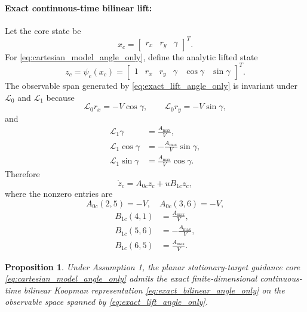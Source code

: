 \documentclass[letterpaper,journal]{IEEEtran}
\newtheorem{proposition}{Proposition}
\begin{document}
\paragraph{Exact continuous-time bilinear lift:}
Let the core state be
\begin{equation}
    x_c=\begin{bmatrix}r_x&r_y&\gamma\end{bmatrix}^T .
\end{equation}
For \eqref{eq:cartesian_model_angle_only}, define the analytic lifted state
\begin{equation}
    z_c=\psi_c(x_c)=
    \begin{bmatrix}
    1&r_x&r_y&\gamma&\cos\gamma&\sin\gamma
    \end{bmatrix}^T .
    \label{eq:exact_lift_angle_only}
\end{equation}
The observable span generated by \eqref{eq:exact_lift_angle_only} is invariant under $\mathcal L_0$ and $\mathcal L_1$ because
\begin{equation}
    \mathcal L_0 r_x=-V\cos\gamma,\qquad
    \mathcal L_0 r_y=-V\sin\gamma ,
\end{equation}
and
\begin{equation}
\begin{aligned}
    \mathcal L_1 \gamma&=\frac{A_{\max}}{V},\\
    \mathcal L_1 \cos\gamma&=-\frac{A_{\max}}{V}\sin\gamma,\\
    \mathcal L_1 \sin\gamma&=\frac{A_{\max}}{V}\cos\gamma .
\end{aligned}
\end{equation}
Therefore
\begin{equation}
    \dot z_c=A_{0c}z_c+uB_{1c}z_c ,
    \label{eq:exact_bilinear_angle_only}
\end{equation}
where the nonzero entries are
\begin{equation}
    A_{0c}(2,5)=-V,\quad A_{0c}(3,6)=-V,
\end{equation}
\begin{equation}
\begin{aligned}
    B_{1c}(4,1)&=\frac{A_{\max}}{V},\\
    B_{1c}(5,6)&=-\frac{A_{\max}}{V},\\
    B_{1c}(6,5)&=\frac{A_{\max}}{V}.
\end{aligned}
\end{equation}

\begin{proposition}
Under Assumption 1, the planar stationary-target guidance core \eqref{eq:cartesian_model_angle_only} admits the exact finite-dimensional continuous-time bilinear Koopman representation \eqref{eq:exact_bilinear_angle_only} on the observable space spanned by \eqref{eq:exact_lift_angle_only}.
\end{proposition}
\end{document}

